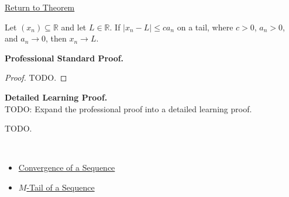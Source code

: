 \newpage
{}
\label{prf:convergence-by-domination}

\begin{remark*}[Return]
\hyperref[thm:convergence-by-domination]{Return to Theorem}
\end{remark*}

\begin{theorem*}
Let $(x_n) \subseteq \mathbb{R}$ and let $L \in \mathbb{R}$. If
$|x_n-L| \le c a_n$ on a tail, where $c>0$, $a_n>0$, and $a_n\to 0$,
then $x_n\to L$.
\end{theorem*}

\textbf{Professional Standard Proof.}~\\
\begin{proof}
TODO.
\end{proof}

\textbf{Detailed Learning Proof.}~\\
TODO: Expand the professional proof into a detailed learning proof.


\begin{remark*}
TODO.
\end{remark*}

\begin{remark*}[Dependencies]~\\
\begin{itemize}
  \item \hyperref[def:convergent-sequence]{Convergence of a Sequence}
  \item \hyperref[def:m-tail]{$M$-Tail of a Sequence}
\end{itemize}
\end{remark*}
